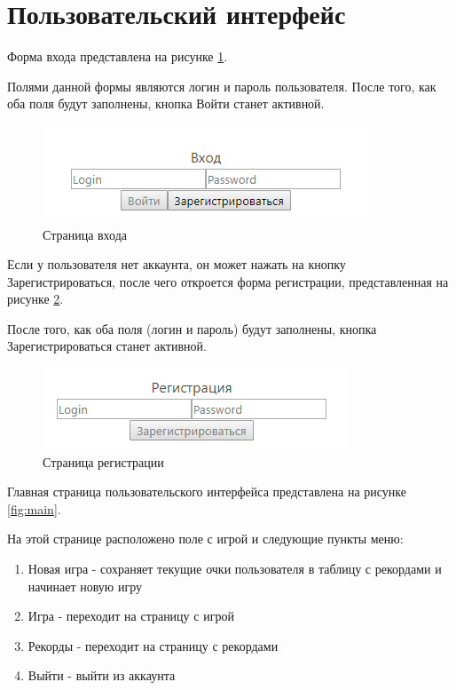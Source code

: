 \documentclass[hidelinks]{article}
\begin{document}
\section{Пользовательский интерфейс}

Форма входа представлена на рисунке \ref{fig:signin}. 

Полями данной формы являются логин и пароль пользователя. После того, как оба поля будут заполнены, кнопка Войти станет активной.

\begin{figure}[H]
    \centering
    \includegraphics[]{img/signin.png}
    \caption{Страница входа}
    \label{fig:signin}
\end{figure}

Если у пользователя нет аккаунта, он может нажать на кнопку Зарегистрироваться, после чего откроется форма регистрации, представленная на рисунке \ref{fig:signup}.

После того, как оба поля (логин и пароль) будут заполнены, кнопка Зарегистрироваться станет активной.

\begin{figure}[H]
    \centering
    \includegraphics[]{img/signup.png}
    \caption{Страница регистрации}
    \label{fig:signup}
\end{figure}

Главная страница пользовательского интерфейса представлена на рисунке \ref{fig:main}. 

На этой странице расположено поле с игрой и следующие пункты меню:
\begin{enumerate}
    \item Новая игра - сохраняет текущие очки пользователя в таблицу с рекордами и начинает новую игру
    \item Игра - переходит на страницу с игрой
    \item Рекорды - переходит на страницу с рекордами
    \item Выйти - выйти из аккаунта
\end{enumerate}
\end{document}
